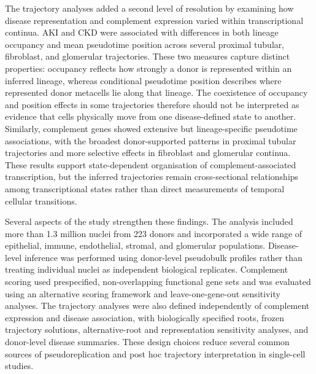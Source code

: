 \documentclass[10pt,letterpaper]{article}
\begin{document}
The trajectory analyses added a second level of resolution by examining how disease representation and complement expression varied within transcriptional continua. AKI and CKD were associated with differences in both lineage occupancy and mean pseudotime position across several proximal tubular, fibroblast, and glomerular trajectories. These two measures capture distinct properties: occupancy reflects how strongly a donor is represented within an inferred lineage, whereas conditional pseudotime position describes where represented donor metacells lie along that lineage. The coexistence of occupancy and position effects in some trajectories therefore should not be interpreted as evidence that cells physically move from one disease-defined state to another. Similarly, complement genes showed extensive but lineage-specific pseudotime associations, with the broadest donor-supported patterns in proximal tubular trajectories and more selective effects in fibroblast and glomerular continua. These results support state-dependent organisation of complement-associated transcription, but the inferred trajectories remain cross-sectional relationships among transcriptional states rather than direct measurements of temporal cellular transitions.

Several aspects of the study strengthen these findings. The analysis included more than 1.3 million nuclei from 223 donors and incorporated a wide range of epithelial, immune, endothelial, stromal, and glomerular populations. Disease-level inference was performed using donor-level pseudobulk profiles rather than treating individual nuclei as independent biological replicates. Complement scoring used prespecified, non-overlapping functional gene sets and was evaluated using an alternative scoring framework and leave-one-gene-out sensitivity analyses. The trajectory analyses were also defined independently of complement expression and disease association, with biologically specified roots, frozen trajectory solutions, alternative-root and representation sensitivity analyses, and donor-level disease summaries. These design choices reduce several common sources of pseudoreplication and post hoc trajectory interpretation in single-cell studies.
\end{document}
